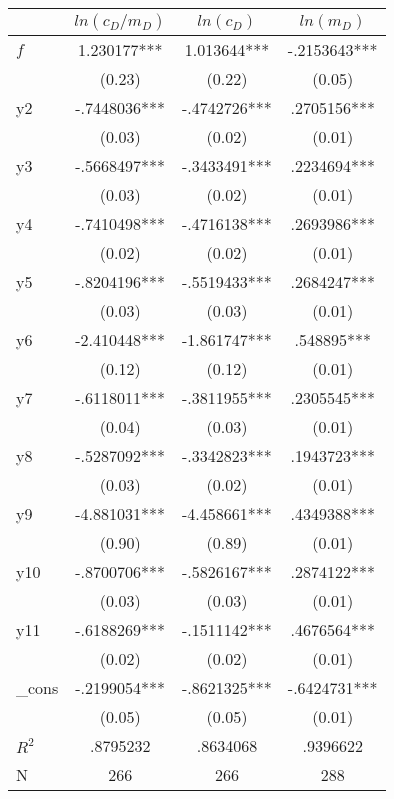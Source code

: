 \begin{tabular}{lccc}
            &   $ln(c_D/m_D)$   &   $ln(c_D)$   &     $ln(m_D)$   \\
\hline
$f$         &    1.230177***&    1.013644***&   -.2153643***\\
            &      (0.23)   &      (0.22)   &      (0.05)   \\
y2          &   -.7448036***&   -.4742726***&    .2705156***\\
            &      (0.03)   &      (0.02)   &      (0.01)   \\
y3          &   -.5668497***&   -.3433491***&    .2234694***\\
            &      (0.03)   &      (0.02)   &      (0.01)   \\
y4          &   -.7410498***&   -.4716138***&    .2693986***\\
            &      (0.02)   &      (0.02)   &      (0.01)   \\
y5          &   -.8204196***&   -.5519433***&    .2684247***\\
            &      (0.03)   &      (0.03)   &      (0.01)   \\
y6          &   -2.410448***&   -1.861747***&     .548895***\\
            &      (0.12)   &      (0.12)   &      (0.01)   \\
y7          &   -.6118011***&   -.3811955***&    .2305545***\\
            &      (0.04)   &      (0.03)   &      (0.01)   \\
y8          &   -.5287092***&   -.3342823***&    .1943723***\\
            &      (0.03)   &      (0.02)   &      (0.01)   \\
y9          &   -4.881031***&   -4.458661***&    .4349388***\\
            &      (0.90)   &      (0.89)   &      (0.01)   \\
y10         &   -.8700706***&   -.5826167***&    .2874122***\\
            &      (0.03)   &      (0.03)   &      (0.01)   \\
y11         &   -.6188269***&   -.1511142***&    .4676564***\\
            &      (0.02)   &      (0.02)   &      (0.01)   \\
\_cons      &   -.2199054***&   -.8621325***&   -.6424731***\\
            &      (0.05)   &      (0.05)   &      (0.01)   \\
$R^2$       &    .8795232   &    .8634068   &    .9396622   \\
N           &         266   &         266   &         288   \\
\end{tabular}
